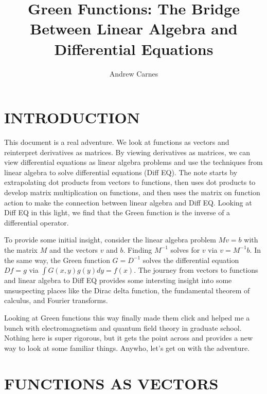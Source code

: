 \documentclass[12pt]{article}
\begin{document}
\title{Green Functions: The Bridge Between Linear Algebra and Differential Equations}
\author{Andrew Carnes}

\maketitle

\newpage
\tableofcontents
\newpage

\section{INTRODUCTION} \label{intro}

This document is a real adventure. We look at functions as vectors and reinterpret derivatives as matrices. By viewing derivatives as matrices, we can view differential equations as linear algebra problems and use the techniques from linear algebra to solve differential equations (Diff EQ). The note starts by extrapolating dot products from vectors to functions, then uses dot products to develop matrix multiplication on functions, and then uses the matrix on function action to make the connection between linear algebra and Diff EQ. Looking at Diff EQ in this light, we find that the Green function is the inverse of a differential operator. 

To provide some initial insight, consider the linear algebra problem $Mv=b$ with the matrix $M$ and the vectors $v$ and $b$. Finding $M^{-1}$ solves for $v$ via $v=M^{-1}b$. In the same way, the Green function $G=D^{-1}$ solves the differential equation $Df=g$ via $\int G(x,y)g(y)dy = f(x)$. The journey from vectors to functions and linear algebra to Diff EQ provides some intersting insight into some unsuspecting places like the Dirac delta function, the fundamental theorem of calculus, and Fourier transforms. 

Looking at Green functions this way finally made them click and helped me a bunch with electromagnetism and quantum field theory in graduate school. Nothing here is super rigorous, but it gets the point across and provides a new way to look at some familiar things. Anywho, let's get on with the adventure.

\section{FUNCTIONS AS VECTORS}  
\end{document}
